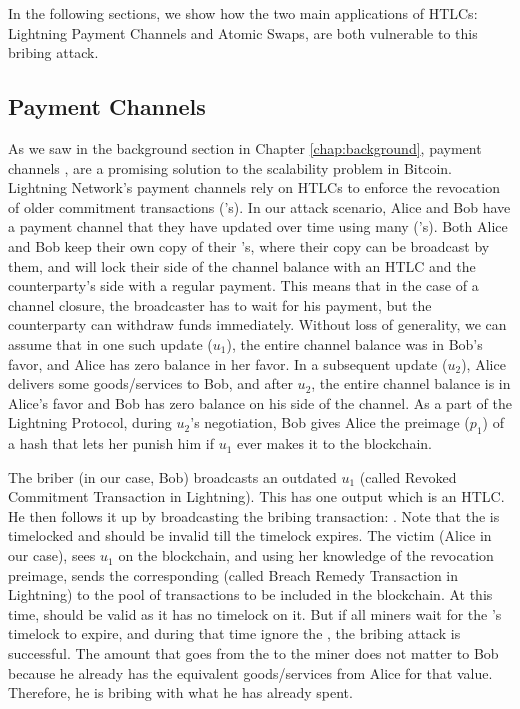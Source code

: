 In the following sections, we show how the two main applications of HTLCs: Lightning Payment Channels and Atomic Swaps, are both vulnerable to this bribing attack.

\subsection{Payment Channels}
As we saw in the background section in Chapter \ref{chap:background}, payment channels \cite{decker_wattenhofer}, \cite{poon_dryja} are a promising solution to the scalability problem in Bitcoin. Lightning Network's \cite{poon_dryja} payment channels rely on HTLCs to enforce the revocation of older commitment transactions (\ctx{}'s). In our attack scenario, Alice and Bob have a payment channel that they have updated over time using many (\ctx{}'s). Both Alice and Bob keep their own copy of their \ctx{}'s, where their copy can be broadcast by them, and will lock their side of the channel balance with an HTLC and the counterparty's side with a regular payment. This means that in the case of a channel closure, the broadcaster has to wait for his payment, but the counterparty can withdraw funds immediately. Without loss of generality, we can assume that in one such update ($u_1$), the entire channel balance was in Bob's favor, and Alice has zero balance in her favor. In a subsequent update ($u_2$), Alice delivers some goods/services to Bob, and after $u_2$, the entire channel balance is in Alice's favor and Bob has zero balance on his side of the channel. As a part of the Lightning Protocol, during $u_2$'s negotiation, Bob gives Alice the preimage ($p_1$) of a hash that lets her punish him if $u_1$ ever makes it to the blockchain. 

The briber (in our case, Bob) broadcasts an outdated \ctx{} $u_1$ (called Revoked Commitment Transaction in Lightning). This has one output which is an HTLC. He then follows it up by broadcasting the bribing transaction: \bribetxn. Note that the \bribetxn{} is timelocked and should be invalid till the timelock expires. The victim (Alice in our case), sees $u_1$ on the blockchain, and using her knowledge of the revocation preimage, sends the corresponding \sellertxn{} (called Breach Remedy Transaction in Lightning) to the pool of transactions to be included in the blockchain. At this time, \sellertxn{} should be valid as it has no timelock on it. But if all miners wait for the \bribetxn{}'s timelock to expire, and during that time ignore the \sellertxn{}, the bribing attack is successful. The amount that goes from the \bribetxn{} to the miner does not matter to Bob because he already has the equivalent goods/services from Alice for that value. Therefore, he is bribing with what he has already spent.

